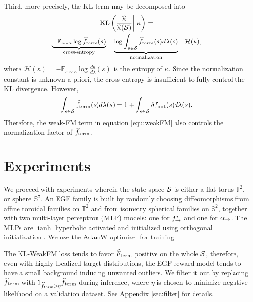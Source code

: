 \documentclass{article}
\theoremstyle{plain}
\theoremstyle{definition}
\theoremstyle{remark}
\theoremstyle{fact}
\begin{document}
Third, more precisely, the KL term may be decomposed into
\begin{multline}
    \mathrm{KL}\left(\left.\frac{\widehat{\kappa}}{\widehat{\kappa}(\mathcal S)} \right\| \kappa \right) =\\ \underbrace{-\mathbb E_{s\sim \kappa}\log \widehat{f}_{\mathrm{term}}(s)}_{\text{cross-entropy}} + \underbrace{\log \int_{s\in \mathcal S} \widehat{f}_{\mathrm{term}}(s)d\lambda(s)}_{\text{normalization}} -  \mathcal H(\kappa), 
\end{multline}
where $\mathcal H(\kappa)=-\mathbb E_{s\sim \kappa} \log\frac{d\kappa}{d\lambda}(s) $ is the entropy of $\kappa$.
Since the normalization constant is unknown a priori,  the cross-entropy is insufficient to fully control the KL divergence. However, 
\begin{equation}
    \int_{s\in \mathcal S} \widehat{f}_{\mathrm{term}}(s)d\lambda(s) =1 + \int_{s\in \mathcal S} \delta f_{\mathrm{init}}(s)d\lambda(s).
\end{equation}
Therefore, the weak-FM term in equation \eqref{equ:weakFM} also controls the normalization factor of $\widehat{f}_{\mathrm{term}}$. 




\section{Experiments}
We proceed with experiments wherein the state space $\mathcal S$ is either a flat torus $\mathbb T^2$, or sphere $\mathbb S^2$. 
An EGF family is built by randomly choosing diffeomorphisms from affine toroidal families on $\mathbb T^2$ and from isometry spherical families on $\mathbb S^2$,
together with two multi-layer perceptron (MLP) models: one for $f^*_{\rightarrow}$ and one for $\alpha_{\rightarrow}$. The MLPs are $\tanh$ hyperbolic activated and initialized using orthogonal initialization \cite{saxe2013exact,hu2020provable}. We use the AdamW optimizer \cite{kingma2015adam,loshchilov2019international} for training.  

The KL-WeakFM loss tends to favor $\widehat{F}_{\mathrm{term}}$ positive on the whole $\mathcal S$, therefore, even with highly localized target distributions, the EGF reward model tends to have a small background inducing unwanted outliers. We filter it out by replacing $\widehat{f}_{\mathrm{term}}$ with $\mathbf{1}_{\widehat{f}_{\mathrm{term}}>\eta}\widehat{f}_{\mathrm{term}}$ during inference, where $\eta$ is chosen to minimize negative likelihood on a validation dataset. See Appendix \ref{sec:filter} for details.
\end{document}
